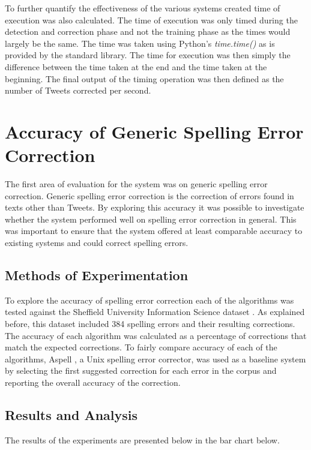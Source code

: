 To further quantify the effectiveness of the various systems created time of execution was also calculated. The time of execution was only timed during the detection and correction phase and not the training phase as the times would largely be the same. The time was taken using Python's \emph{time.time()} \cite{} as is provided by the standard library. The time for execution was then simply the difference between the time taken at the end and the time taken at the beginning. The final output of the timing operation was then defined as the number of Tweets corrected per second.

\section{Accuracy of Generic Spelling Error Correction}
The first area of evaluation for the system was on generic spelling error correction. Generic spelling error correction is the correction of errors found in texts other than Tweets. By exploring this accuracy it was possible to investigate whether the system performed well on spelling error correction in general. This was important to ensure that the system offered at least comparable accuracy to existing systems and could correct spelling errors.

\subsection{Methods of Experimentation}
To explore the accuracy of spelling error correction each of the algorithms was tested against the Sheffield University Information Science dataset \cite{}. As explained before, this dataset included 384 spelling errors and their resulting corrections. The accuracy of each algorithm was calculated as a percentage of corrections that match the expected corrections. To fairly compare accuracy of each of the algorithms, Aspell \cite{}, a Unix spelling error corrector, was used as a baseline system by selecting the first suggested correction for each error in the corpus and reporting the overall accuracy of the correction.

\subsection{Results and Analysis}
The results of the experiments are presented below in the bar chart below.


